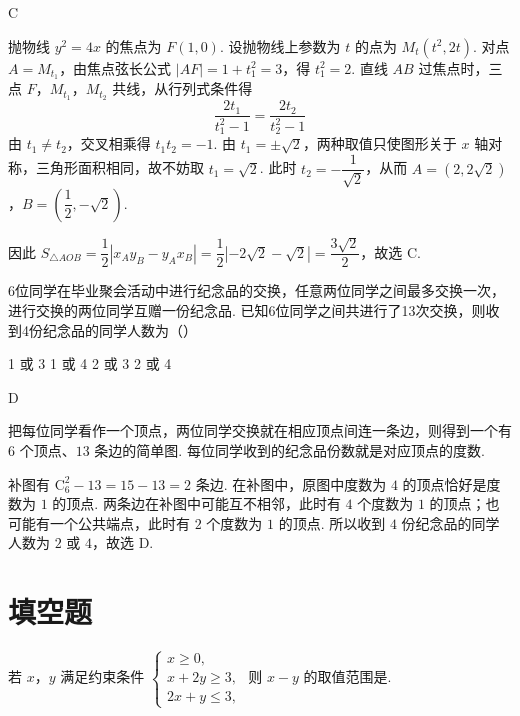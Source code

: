 \begin{answer}
C
\end{answer}

\begin{solution}
抛物线 \(y^2=4x\) 的焦点为 \(F(1,0)\). 设抛物线上参数为 \(t\) 的点为 \(M_t(t^2,2t)\). 对点 \(A=M_{t_1}\)，由焦点弦长公式 \(|AF|=1+t_1^2=3\)，得 \(t_1^2=2\). 直线 \(AB\) 过焦点时，三点 \(F\)，\(M_{t_1}\)，\(M_{t_2}\) 共线，从行列式条件得
\[
\frac{2t_1}{t_1^2-1}=\frac{2t_2}{t_2^2-1}
\]
由 \(t_1\ne t_2\)，交叉相乘得 \(t_1t_2=-1\). 由 \(t_1=\pm\sqrt{2}\)，两种取值只使图形关于 \(x\) 轴对称，三角形面积相同，故不妨取 \(t_1=\sqrt{2}\). 此时 \(t_2=-\dfrac{1}{\sqrt{2}}\)，从而 \(A=(2,2\sqrt{2})\)，\(B=\left(\dfrac{1}{2},-\sqrt{2}\right)\).

因此
\(S_{\triangle AOB}=\dfrac{1}{2}\left|x_Ay_B-y_Ax_B\right|=\dfrac{1}{2}\left|-2\sqrt{2}-\sqrt{2}\right|=\dfrac{3\sqrt{2}}{2}\)，故选 C.
\end{solution}

\begin{problem}
6位同学在毕业聚会活动中进行纪念品的交换，任意两位同学之间最多交换一次，进行交换的两位同学互赠一份纪念品. 已知6位同学之间共进行了13次交换，则收到4份纪念品的同学人数为（\quad）

\choices
    {1 或 3}
    {1 或 4}
    {2 或 3}
    {2 或 4}
\end{problem}

\begin{answer}
D
\end{answer}

\begin{solution}
把每位同学看作一个顶点，两位同学交换就在相应顶点间连一条边，则得到一个有 \(6\) 个顶点、\(13\) 条边的简单图. 每位同学收到的纪念品份数就是对应顶点的度数.

补图有 \(\mathrm C_6^2-13=15-13=2\) 条边. 在补图中，原图中度数为 \(4\) 的顶点恰好是度数为 \(1\) 的顶点. 两条边在补图中可能互不相邻，此时有 \(4\) 个度数为 \(1\) 的顶点；也可能有一个公共端点，此时有 \(2\) 个度数为 \(1\) 的顶点. 所以收到 \(4\) 份纪念品的同学人数为 \(2\) 或 \(4\)，故选 D.
\end{solution}

\section{填空题}

\begin{problem}
若 \(x\)，\(y\) 满足约束条件 \(\begin{cases}
x \geqslant 0,\\
x + 2y \geqslant 3,\\
2x + y \leqslant 3,
\end{cases}\) 则 \(x - y\) 的取值范围是\fillinblank{}.
\end{problem}

